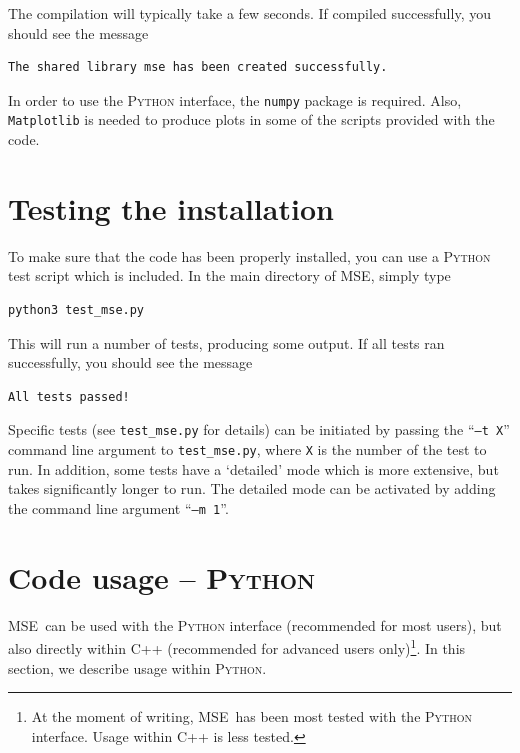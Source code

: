 \documentclass[a4paper,11pt]{article}
\newcommand{\mse}{\textsc{MSE}}
\begin{document}
The compilation will typically take a few seconds. If compiled successfully, you should see the message
\begin{lstlisting}[caption={},label={code:wrap},language=bash]
The shared library mse has been created successfully.
\end{lstlisting}

In order to use the \textsc{Python} interface, the \texttt{numpy} package is required. Also, \texttt{Matplotlib} is needed to produce plots in some of the scripts provided with the code.
 



\section{Testing the installation}
To make sure that the code has been properly installed, you can use a \textsc{Python} test script which is included. In the main directory of \mse, simply type
\begin{lstlisting}[caption={},label={code:wrap},language=bash]
python3 test_mse.py
\end{lstlisting}
This will run a number of tests, producing some output. If all tests ran successfully, you should see the message
\begin{lstlisting}[caption={},label={code:wrap},language=bash]
All tests passed!
\end{lstlisting}

\begin{leftbar}
Specific tests (see \texttt{test\_mse.py} for details) can be initiated by passing the ``\texttt{--t X}'' command line argument to \texttt{test\_mse.py}, where \texttt{X} is the number of the test to run. In addition, some tests have a `detailed' mode which is more extensive, but takes significantly longer to run. The detailed mode can be activated by adding the command line argument ``\texttt{--m 1}''.
\end{leftbar}

\section{Code usage -- \textsc{Python}}
\label{sect:usepy}
\mse~can be used with the \textsc{Python} interface (recommended for most users), but also directly within \textsc{C++} (recommended for advanced users only)\footnote{At the moment of writing, \mse~has been most tested with the \textsc{Python} interface. Usage within \textsc{C++} is less tested.}. In this section, we describe usage within \textsc{Python}.
\end{document}
